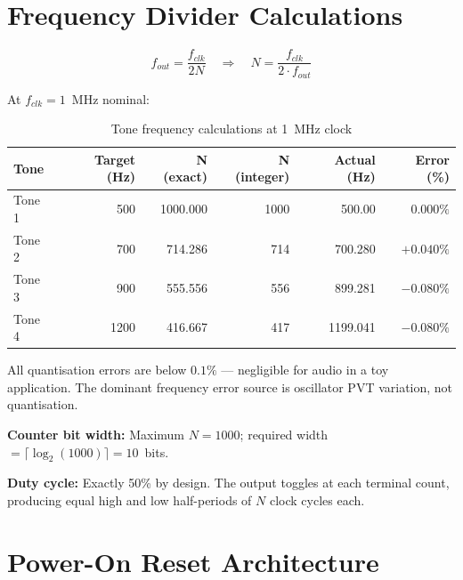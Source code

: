 \documentclass[11pt,a4paper]{article}
\begin{document}
\section{Frequency Divider Calculations}

\begin{equation}
  f_{out} = \frac{f_{clk}}{2N}
  \quad \Rightarrow \quad
  N = \frac{f_{clk}}{2 \cdot f_{out}}
\end{equation}

At $f_{clk} = 1$~MHz nominal:

\begin{table}[H]
  \centering
  \caption{Tone frequency calculations at 1~MHz clock}
  \begin{tabular}{lrrrrr}
    \toprule
    \textbf{Tone} & \textbf{Target (Hz)} & \textbf{N (exact)} & \textbf{N (integer)} &
    \textbf{Actual (Hz)} & \textbf{Error (\%)} \\
    \midrule
    Tone 1 & 500   & 1000.000 & 1000 & 500.00   & $0.000\%$ \\
    Tone 2 & 700   & 714.286  & 714  & 700.280  & $+0.040\%$ \\
    Tone 3 & 900   & 555.556  & 556  & 899.281  & $-0.080\%$ \\
    Tone 4 & 1200  & 416.667  & 417  & 1199.041 & $-0.080\%$ \\
    \bottomrule
  \end{tabular}
\end{table}

All quantisation errors are below $0.1\%$ --- negligible for audio in a toy application.
The dominant frequency error source is oscillator PVT variation, not quantisation.

\textbf{Counter bit width:} Maximum $N = 1000$; required width $= \lceil \log_2(1000) \rceil = 10$~bits.

\textbf{Duty cycle:} Exactly 50\% by design. The output toggles at each terminal count, producing
equal high and low half-periods of $N$ clock cycles each.

\section{Power-On Reset Architecture}
\end{document}
